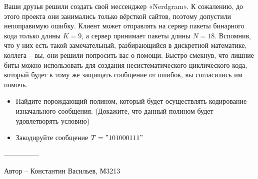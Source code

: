 \question
Ваши друзья решили создать свой мессенджер «Nerdgram». К сожалению, до этого проекта они занимались только вёрсткой сайтов, поэтому допустили непоправимую ошибку. Клиент может отправлять на сервер пакеты бинарного кода только длины $K = 9$, а сервер принимает пакеты длины $N = 18$. Вспомнив, что у них есть такой замечательный, разбирающийся в дискретной математике, коллега -- вы, они решили попросить вас о помощи. Быстро смекнув, что лишние биты можно использовать для создания несистематического циклического кода, который будет к тому же защищать сообщение от ошибок, вы согласились им помочь.
\begin{itemize}
\item Найдите порождающий полином, который будет осуществлять кодирование изначального сообщения. (Докажите, что данный полином будет удовлетворять условию)
\item Закодируйте сообщение $T = "101000111"$
\end{itemize}

---------------

Автор -- Константин Васильев, М3213